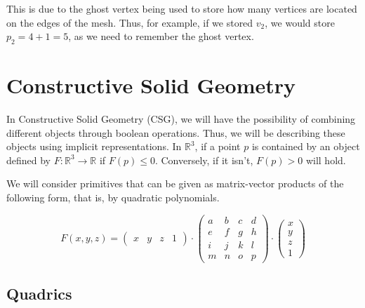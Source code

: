 \documentclass{panikzettel}
\begin{document}
This is due to the ghost vertex being used to store how many vertices are located on the edges of the mesh. Thus, for example, if we stored $v_2$, we would store $p_2 = 4 + 1 = 5$, as we need to remember the ghost vertex.

\section{Constructive Solid Geometry}

In Constructive Solid Geometry (CSG), we will have the possibility of combining different objects through boolean operations. Thus, we will be describing these objects using implicit representations. In $\mathbb{R}^3$, if a point $p$ is contained by an object defined by $F: \mathbb{R}^3 \to \mathbb{R}$ if $F(p) \le 0$. Conversely, if it isn't, $F(p) > 0$ will hold.

We will consider primitives that can be given as matrix-vector products of the following form, that is, by quadratic polynomials.

$$F(x,y,z) = \begin{pmatrix} x & y & z & 1 \end{pmatrix} \cdot
\begin{pmatrix}
a & b & c & d \\
e & f & g & h \\
i & j & k & l \\
m & n & o & p
\end{pmatrix} \cdot
\begin{pmatrix} x \\ y \\ z \\ 1 \end{pmatrix}$$

\subsection{Quadrics}
\end{document}
